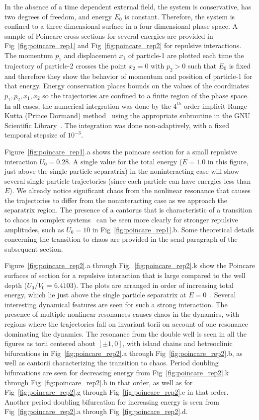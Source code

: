 In the absence of a time dependent external field, the system is conservative, has two degrees of freedom, and energy  $E_0$ is constant. Therefore,  the system is confined to a three dimensional surface in a four dimensional phase space. A sample of Poincare cross sections for several energies are provided in Fig~\ref{fig:poincare_rep1} and Fig~\ref{fig:poincare_rep2}  for repulsive interactions.  The momentum $p_1$ and displacement $x_1$ of particle-1 are plotted each time the trajectory of particle-2 crosses the point  $x_2 = 0$  with $p_2 > 0$ such that $E_0$ is fixed and therefore they show the behavior of  momentum and position of particle-1 for that energy. Energy conservation places bounds on the values of  the coordinates $p_1, p_2, x_1, x_2$ so the trajectories are confined to a finite region of the phase space. In all cases, the numerical integration was done by the $4^{th}$ order implicit Runge Kutta (Prince Dormand) method~\cite{rkutta:pd} using the appropriate subroutine in the GNU Scientific Library~\cite{galassi:gsl}. The integration was done non-adaptively, with a fixed temporal stepsize of $10^{-3}$.

Figure~\ref{fig:poincare_rep1}.a shows the poincare section for a small repulsive interaction $U_0=0.28$. A single value for the total energy ($E=1.0$ in this figure, just above the single particle separatrix) in the noninteracting case will show several single particle trajectories (since each particle can have energies less than $E$). We already notice significant chaos from the nonlinear resonance that causes the trajectories to differ from the noninteracting case as we approach the separatrix region. The presence of a cantorus that is characteristic of a transition to chaos in complex systems~\cite{reichl} can be seen more clearly for stronger repulsive amplitudes, such as $U_0=10$ in Fig~\ref{fig:poincare_rep1}.b.  Some theoretical details concerning the transition to chaos are provided in the send paragraph of the subsequent section.

Figure~\ref{fig:poincare_rep2}.a through Fig.~\ref{fig:poincare_rep2}.k show the Poincare surfaces of section for a repulsive interaction that is large compared to the well depth ($U_0/V_0 =6.4103$). The plots are arranged in order of increasing total energy, which lie just above the single particle separatrix at $E=0$~\cite{reichl}. Several interesting dynamical features are seen for such a strong interaction. The presence of multiple nonlinear resonances causes chaos in the dynamics, with regions where the trajectories fall on invariant torii on account of one resonance dominating the dynamics. The resonance from the double well is seen in all the figures as torii centered about $\left[\pm1, 0 \right]$, with island chains and hetreoclinic bifurcations in Fig~\ref{fig:poincare_rep2}.a through Fig~\ref{fig:poincare_rep2}.b, as well as cantorii characterizing the transition to chaos. Period doubling bifurcations are seen for decreasing energy from Fig~\ref{fig:poincare_rep2}.k through Fig~\ref{fig:poincare_rep2}.h in that order, as well as  for Fig~\ref{fig:poincare_rep2}.g through Fig~\ref{fig:poincare_rep2}.e in that order. Another period doubling bifurcation for increasing energy is seen from Fig~\ref{fig:poincare_rep2}.a through Fig~\ref{fig:poincare_rep2}.d.

